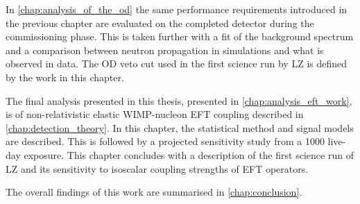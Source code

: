 \par
In \autoref{chap:analysis_of_the_od} the same performance requirements introduced in the previous chapter are evaluated on the completed detector during the commissioning phase.
This is taken further with a fit of the background spectrum and a comparison between neutron propagation in simulations and what is observed in data.
The OD veto cut used in the first science run by LZ is defined by the work in this chapter.

\par
The final analysis presented in this thesis, presented in \autoref{chap:analysis_eft_work}, is of non-relativistic elastic WIMP-nucleon EFT coupling described in \autoref{chap:detection_theory}.
In this chapter, the statistical method and signal models are described.
This is followed by a projected sensitivity study from a 1000 live-day exposure.
This chapter concludes with a description of the first science run of LZ and its sensitivity to isoscalar coupling strengths of EFT operators.

\par
The overall findings of this work are summarised in \autoref{chap:conclusion}.
